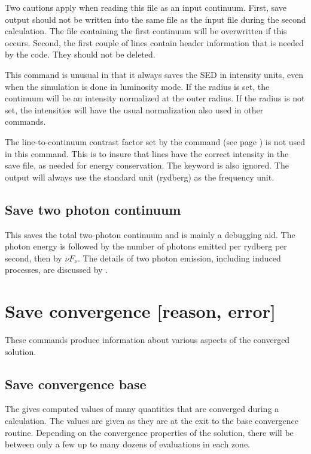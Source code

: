 Two cautions apply when reading this file as an input continuum. First, save
output should not be written into the same file as the input file during the
second calculation. The file containing the first continuum will be
overwritten if this occurs. Second, the first couple of lines contain header
information that is needed by the code. They should not be deleted.

This command is unusual in that it always saves the SED in intensity units,
even when the simulation is done in luminosity mode. If the radius is set, the
continuum will be an intensity normalized at the outer radius. If the radius
is not set, the intensities will have the usual normalization also used in
other  commands.

The line-to-continuum contrast factor 
set by the  command
(see page \pageref{sec:CommandSetSaveLWidth})
is not used in this command.  This is to insure that lines have
the correct intensity in the save file, as needed for energy conservation.
The  keyword is also ignored. The output will always use
the standard unit (rydberg) as the frequency unit.

\subsection{Save two photon continuum}

This saves the total two-photon continuum and is mainly a debugging
aid.  The photon energy is followed by the number of photons emitted per
rydberg per second, then by $\nu F_\nu$.  The details of two photon emission,
including induced processes, are discussed by \citet{Bottorff2006}.

\section{Save convergence [reason, error]}

These commands produce information about various aspects of the converged
solution.

\subsection{Save convergence base}

The gives computed values of many quantities that are converged during
a calculation.  The values are given as they are at the exit to the base
convergence routine.  Depending on the convergence properties of the
solution, there will be between only a few up to many
dozens of evaluations in each zone.

